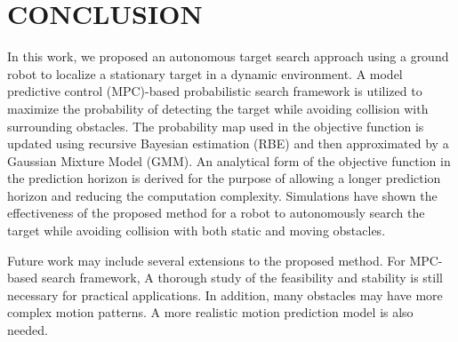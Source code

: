 \documentclass[twocolumn,10pt]{asme2e}
\begin{document}

\section*{CONCLUSION}\label{sec:conclusion}
In this work, we proposed an autonomous target search approach using a ground robot to localize a stationary target in a dynamic environment.
A model predictive control (MPC)-based probabilistic search framework is utilized to 
maximize the probability of detecting the target while avoiding collision with surrounding obstacles.
The probability map used in the objective function is updated using recursive Bayesian estimation (RBE) and then approximated by a Gaussian Mixture Model (GMM).
An analytical form of the objective function in the prediction horizon is derived for the purpose of allowing a longer prediction horizon and reducing the computation complexity.
Simulations have shown the effectiveness of the proposed method for a robot to autonomously search the target while avoiding collision with both static and moving obstacles.

Future work may include several extensions to the proposed method.
For MPC-based search framework, A thorough study of the feasibility and stability is still necessary for practical applications.
In addition, many obstacles may have more complex motion patterns. A more realistic motion prediction model is also needed.
\end{document}
